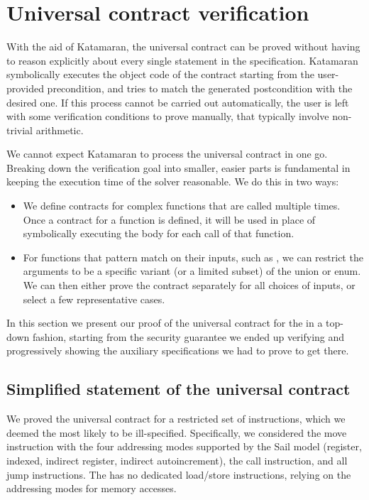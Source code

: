 \section{Universal contract verification}
\label{sec:uc-verification}


With the aid of Katamaran, the universal contract can be proved without having to reason explicitly about every single statement in the \usail specification. Katamaran symbolically executes the object code of the contract starting from the user-provided precondition, and tries to match the generated postcondition with the desired one. If this process cannot be carried out automatically, the user is left with some verification conditions to prove manually, that typically involve non-trivial arithmetic.

We cannot expect Katamaran to process the universal contract in one go. Breaking down the verification goal into smaller, easier parts is fundamental in keeping the execution time of the solver reasonable. We do this in two ways:
\begin{itemize}
\item We define contracts for complex functions that are called multiple times. Once a contract for a function is defined, it will be used in place of symbolically executing the body for each call of that function.
\item For functions that pattern match on their inputs, such as , we can restrict the arguments to be a specific variant (or a limited subset) of the union or enum. We can then either prove the contract separately for all choices of inputs, or select a few representative cases.
\end{itemize}

In this section we present our proof of the universal contract for the \msp in a top-down fashion, starting from the security guarantee we ended up verifying and progressively showing the auxiliary specifications we had to prove to get there.

\subsection{Simplified statement of the universal contract}
\label{sec:uc-simple}

We proved the universal contract for a restricted set of instructions, which we deemed the most likely to be ill-specified. Specifically, we considered the move instruction with the four addressing modes supported by the Sail model (register, indexed, indirect register, indirect autoincrement), the call instruction, and all jump instructions. The \msp has no dedicated load/store instructions, relying on the addressing modes for memory accesses.


